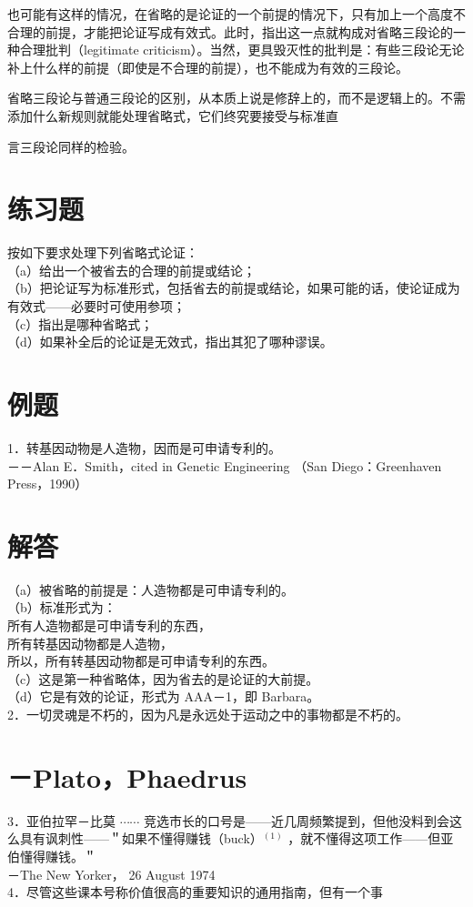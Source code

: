 也可能有这样的情况，在省略的是论证的一个前提的情况下，只有加上一个高度不合理的前提，才能把论证写成有效式。此时，指出这一点就构成对省略三段论的一种合理批判（legitimate criticism）。当然，更具毁灭性的批判是：有些三段论无论补上什么样的前提（即使是不合理的前提），也不能成为有效的三段论。

省略三段论与普通三段论的区别，从本质上说是修辞上的，而不是逻辑上的。不需添加什么新规则就能处理省略式，它们终究要接受与标准直

言三段论同样的检验。

\section*{练习题}
按如下要求处理下列省略式论证：\\
（a）给出一个被省去的合理的前提或结论；\\
（b）把论证写为标准形式，包括省去的前提或结论，如果可能的话，使论证成为有效式——必要时可使用参项；\\
（c）指出是哪种省略式；\\
（d）如果补全后的论证是无效式，指出其犯了哪种谬误。

\section*{例题}
1．转基因动物是人造物，因而是可申请专利的。\\
－－Alan E．Smith，cited in Genetic Engineering （San Diego：Greenhaven Press，1990）

\section*{解答}
（a）被省略的前提是：人造物都是可申请专利的。\\
（b）标准形式为：\\
所有人造物都是可申请专利的东西，\\
所有转基因动物都是人造物，\\
所以，所有转基因动物都是可申请专利的东西。\\
（c）这是第一种省略体，因为省去的是论证的大前提。\\
（d）它是有效的论证，形式为 AAA－1，即 Barbara。\\
2．一切灵魂是不朽的，因为凡是永远处于运动之中的事物都是不朽的。

\section*{－Plato，Phaedrus}
3．亚伯拉罕－比莫 $\cdots \cdots$ 竞选市长的口号是——近几周频繁提到，但他没料到会这么具有讽刺性——＂如果不懂得赚钱（buck）${ }^{(1)}$ ，就不懂得这项工作——但亚伯懂得赚钱。＂\\
－The New Yorker， 26 August 1974\\
4．尽管这些课本号称价值很高的重要知识的通用指南，但有一个事

